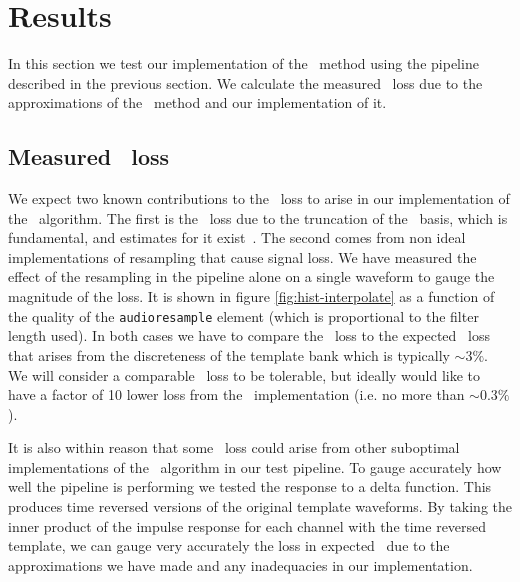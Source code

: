 \section{Results}
\label{SECIV}\label{sec:results}

In this section we test our implementation of the \lloid\ method using the
pipeline described in the previous section.  We calculate the measured \SNR\
loss due to the approximations of the \lloid\ method and our implementation of
it.
%
%
%


\subsection{Measured \SNR\ loss}

We expect two known contributions to the \SNR\ loss to arise in our
implementation of the \lloid\ algorithm.  The first is the \SNR\ loss due to
the truncation of the \SVD\ basis, which is fundamental, and estimates for it
exist~\cite{Cannon:2010p10398}.  The second comes from non ideal
implementations of resampling that cause signal loss.  We have measured the
effect of the resampling in the pipeline alone on a single waveform to gauge
the magnitude of the loss.  It is shown in figure \ref{fig:hist-interpolate} as a
function of the quality of the {\tt audioresample} element (which is
proportional to the filter length used).  In both cases we have to compare the
\SNR\ loss to the expected \SNR\ loss that arises from the discreteness of the
template bank which is typically $\sim 3\%$.  We will consider a comparable
\SNR\ loss to be tolerable, but ideally would like to have a factor of 10 lower
loss from the \lloid\ implementation (i.e. no more than $\sim 0.3 \%$).

It is also within reason that some \SNR\ loss could arise from other suboptimal
implementations of the \lloid\ algorithm in our test pipeline.  To gauge
accurately how well the pipeline is performing we tested the response to a
delta function.  This produces time reversed versions of the original template
waveforms. By taking the inner product of the impulse response for each channel
with the time reversed template, we can gauge very accurately the loss in
expected \SNR\ due to the approximations we have made and any inadequacies in
our implementation. 

